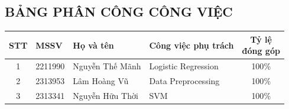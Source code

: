 \begin{center}
  \section*{BẢNG PHÂN CÔNG CÔNG VIỆC}
  \small
  \renewcommand{\arraystretch}{1.2}
  \begin{tabularx}{\textwidth}{|c|l|l|X|c|}
    \hline
    \rowcolor{gray!20}
    \textbf{STT} & \textbf{MSSV} & \textbf{Họ và tên} &
    \textbf{Công việc phụ trách} & \shortstack{\textbf{Tỷ lệ}\\\textbf{đóng góp}} \\
    \hline
    1 & 2211990 & Nguyễn Thế Mãnh & Logistic Regression & 100{\%} \\
    \hline
    2 & 2313953 & Lâm Hoàng Vũ & Data Preprocessing & 100{\%} \\
    \hline
    3 & 2313341 & Nguyễn Hữu Thời & SVM & 100{\%} \\
    \hline
  \end{tabularx}
\end{center}
\clearpage
